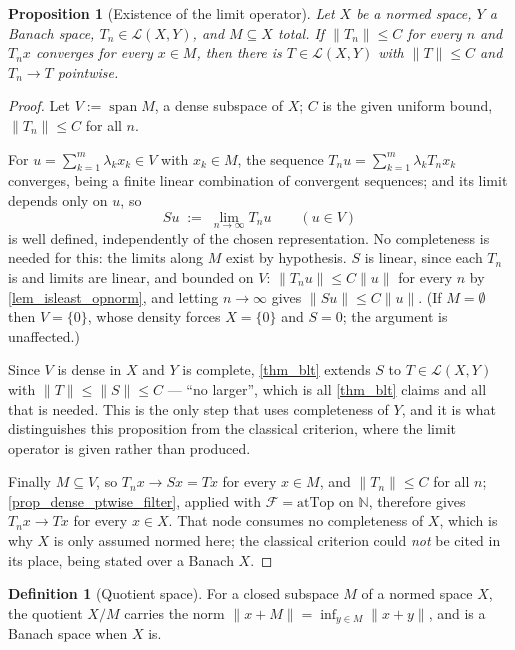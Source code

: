 \documentclass[a4paper]{report}
\theoremstyle{plain}
\newtheorem{proposition}[theorem]{Proposition}
\theoremstyle{definition}
\newtheorem{definition}[theorem]{Definition}
\theoremstyle{remark}
\begin{document}
\begin{proposition}[Existence of the limit operator]
  \label{prop_ptwise_limit_exists}
  Let $X$ be a normed space, $Y$ a Banach space, $T_n \in \mathcal{L}(X,Y)$, and
  $M \subseteq X$ total.  If $\|T_n\| \le C$ for every $n$ and $T_nx$ converges for every
  $x \in M$, then there is $T \in \mathcal{L}(X,Y)$ with $\|T\| \le C$ and
  $T_n \to T$ pointwise.
\end{proposition}
\begin{proof}
  Let $V := \operatorname{span}M$, a dense subspace of $X$; $C$ is the given uniform
  bound, $\|T_n\| \le C$ for all $n$.

  For $u = \sum_{k=1}^m\lambda_kx_k \in V$ with $x_k \in M$, the sequence
  $T_nu = \sum_{k=1}^m \lambda_kT_nx_k$ converges, being a finite linear combination of
  convergent sequences; and its limit depends only on $u$, so
  \[
    Su \;:=\; \lim_{n\to\infty} T_nu \qquad (u \in V)
  \]
  is well defined, independently of the chosen representation.  No completeness is needed
  for this: the limits along $M$ exist by hypothesis.  $S$ is linear, since each $T_n$ is
  and limits are linear, and bounded on $V$: $\|T_nu\| \le C\|u\|$ for every $n$ by
  \cref{lem_isleast_opnorm}, and letting $n \to \infty$ gives $\|Su\| \le C\|u\|$.  (If
  $M = \emptyset$ then $V = \{0\}$, whose density forces $X = \{0\}$ and $S = 0$; the
  argument is unaffected.)

  Since $V$ is dense in $X$ and $Y$ is complete, \cref{thm_blt} extends $S$ to
  $T \in \mathcal{L}(X,Y)$ with $\|T\| \le \|S\| \le C$ --- ``no larger'', which is all
  \cref{thm_blt} claims and all that is needed.  This is the only step that uses
  completeness of $Y$, and it is what distinguishes this proposition from the classical
  criterion, where the limit operator is given rather than produced.

  Finally $M \subseteq V$, so $T_nx \to Sx = Tx$ for every $x \in M$, and
  $\|T_n\| \le C$ for all $n$; \cref{prop_dense_ptwise_filter}, applied with
  $\mathcal{F} = \mathrm{atTop}$ on $\mathbb{N}$, therefore gives $T_nx \to Tx$ for every
  $x \in X$.  That node consumes no completeness of $X$, which is why $X$ is only assumed
  normed here; the classical criterion could \emph{not} be cited in its place, being
  stated over a Banach $X$.
\end{proof}


\begin{definition}[Quotient space]
  \label{def_quotient}
  For a closed subspace $M$ of a normed space $X$, the quotient $X/M$ carries the norm
  $\|x+M\| = \inf_{y \in M}\|x+y\|$, and is a Banach space when $X$ is.
\end{definition}
\end{document}
